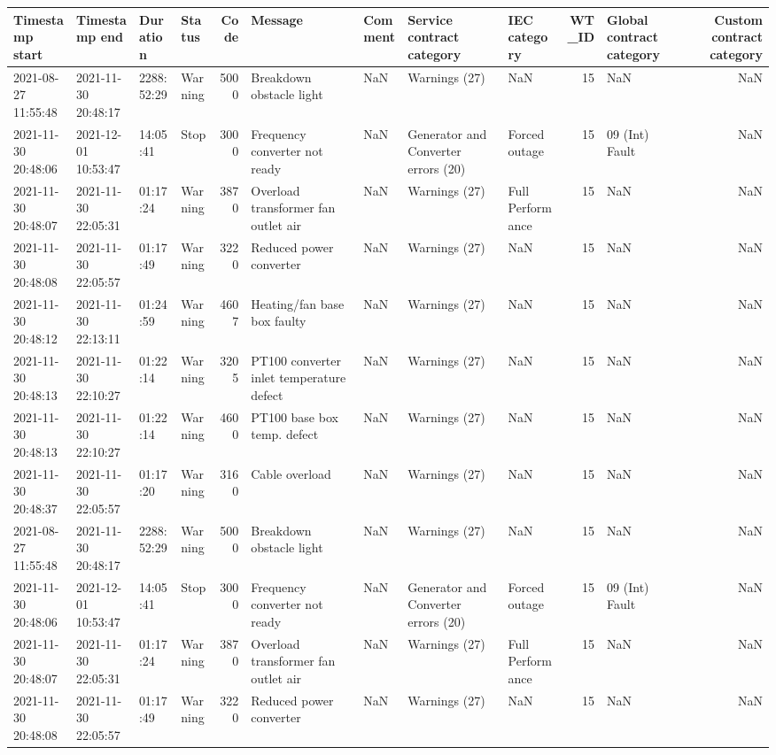 \begin{tabular}{llllrllllrlr}
\toprule
Timestamp start & Timestamp end & Duration & Status & Code & Message & Comment & Service contract category & IEC category & WT\_ID & Global contract category & Custom contract category \\
\midrule
2021-08-27 11:55:48 & 2021-11-30 20:48:17 & 2288:52:29 & Warning & 5000 & Breakdown obstacle light & NaN & Warnings (27) & NaN & 15 & NaN & NaN \\
2021-11-30 20:48:06 & 2021-12-01 10:53:47 & 14:05:41 & Stop & 3000 & Frequency converter not ready & NaN & Generator and Converter errors (20) & Forced outage & 15 & 09 (Int) Fault & NaN \\
2021-11-30 20:48:07 & 2021-11-30 22:05:31 & 01:17:24 & Warning & 3870 & Overload transformer fan outlet air & NaN & Warnings (27) & Full Performance & 15 & NaN & NaN \\
2021-11-30 20:48:08 & 2021-11-30 22:05:57 & 01:17:49 & Warning & 3220 & Reduced power converter & NaN & Warnings (27) & NaN & 15 & NaN & NaN \\
2021-11-30 20:48:12 & 2021-11-30 22:13:11 & 01:24:59 & Warning & 4607 & Heating/fan base box faulty & NaN & Warnings (27) & NaN & 15 & NaN & NaN \\
2021-11-30 20:48:13 & 2021-11-30 22:10:27 & 01:22:14 & Warning & 3205 & PT100 converter inlet temperature defect & NaN & Warnings (27) & NaN & 15 & NaN & NaN \\
2021-11-30 20:48:13 & 2021-11-30 22:10:27 & 01:22:14 & Warning & 4600 & PT100 base box temp. defect & NaN & Warnings (27) & NaN & 15 & NaN & NaN \\
2021-11-30 20:48:37 & 2021-11-30 22:05:57 & 01:17:20 & Warning & 3160 & Cable overload & NaN & Warnings (27) & NaN & 15 & NaN & NaN \\
2021-08-27 11:55:48 & 2021-11-30 20:48:17 & 2288:52:29 & Warning & 5000 & Breakdown obstacle light & NaN & Warnings (27) & NaN & 15 & NaN & NaN \\
2021-11-30 20:48:06 & 2021-12-01 10:53:47 & 14:05:41 & Stop & 3000 & Frequency converter not ready & NaN & Generator and Converter errors (20) & Forced outage & 15 & 09 (Int) Fault & NaN \\
2021-11-30 20:48:07 & 2021-11-30 22:05:31 & 01:17:24 & Warning & 3870 & Overload transformer fan outlet air & NaN & Warnings (27) & Full Performance & 15 & NaN & NaN \\
2021-11-30 20:48:08 & 2021-11-30 22:05:57 & 01:17:49 & Warning & 3220 & Reduced power converter & NaN & Warnings (27) & NaN & 15 & NaN & NaN \\

\end{tabular}
